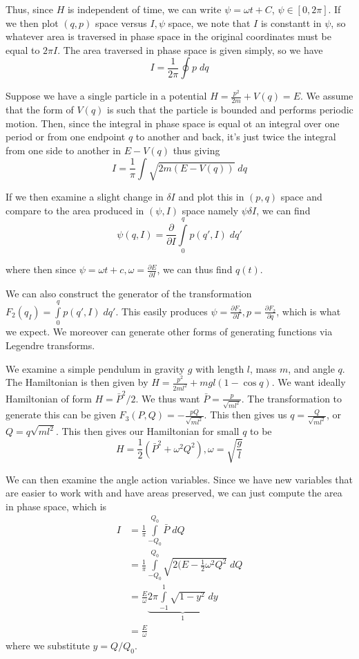 \documentclass[10pt]{report}
\newcommand{\pd}[2]{\frac{\partial #1}{\partial#2}}
\begin{document}
Thus, since $H$ is independent of time, we can write $\psi = \omega t + C$, $\psi \in \left[ 0,2\pi \right]$. If we then plot $(q,p)$ space versus $I,\psi$ space, we note that $I$ is constantt in $\psi$, so whatever area is traversed in phase space in the original coordinates must be equal to $2\pi I$. The area traversed in phase space is given simply, so we have
$$I = \frac{1}{2\pi}\oint p\; dq$$

Suppose we have a single particle in a potential $H = \frac{p^2}{2m} + V(q) = E$. We assume that the form of $V(q)$ is such that the particle is bounded and performs periodic motion. Then, since the integral in phase space is equal ot an integral over one period or from one endpoint $q$ to another and back, it's just twice the integral from one side to another in $E - V(q)$ thus giving
$$I = \frac{1}{\pi}\int \sqrt{2m(E-V(q))}\; dq$$

If we then examine a slight change in $\delta I$ and plot this in $(p,q)$ space and compare to the area produced in $(\psi,I)$ space namely $\psi \delta I$, we can find
$$\psi(q,I) = \pd{}{I}\displaystyle\int\limits_{0}^{q}p(q',I)\;dq'$$

where then since $\psi = \omega t + c, \omega = \pd{E}{I}$, we can thus find $q(t)$.

We can also construct the generator of the transformation $F_2(q_I) = \displaystyle\int\limits_{0}^{q}p(q',I)\;dq'$. This easily produces $\psi = \pd{F_2}{I}, p = \pd{F_2}{q}$, which is what we expect. We moreover can generate other forms of generating functions via Legendre transforms.

We examine a simple pendulum in gravity $g$ with length $l$, mass $m$, and angle $q$. The Hamiltonian is then given by $H = \frac{p^2}{2ml^2} + mgl(1-\cos q)$. We want ideally Hamiltonian of form $H = \bar{P}^2/2$. We thus want $\bar{P} = \frac{p}{\sqrt{ml^2}}$. The transformation to generate this can be given $F_3(P,Q) = -\frac{pQ}{\sqrt{ml^2}}$. This then gives us $q = \frac{Q}{\sqrt{ml^2}}$, or $Q = q\sqrt{ml^2}$. This then gives our Hamiltonian for small $q$ to be 
$$H = \frac{1}{2}(\bar{P}^2 + \omega^2Q^2), \omega = \sqrt{\frac{g}{l}}$$

We can then examine the angle action variables. Since we have new variables that are easier to work with and have areas preserved, we can just compute the area in phase space, which is
\begin{align*}
    I &= \frac{1}{\pi}\displaystyle\int\limits_{-Q_0}^{Q_0}\bar{P}\;dQ\\
    &= \frac{1}{\pi}\displaystyle\int\limits_{-Q_0}^{Q_0}\sqrt{2(E-\frac{1}{2}\omega^2Q^2}\;dQ\\
    &= \frac{E}{\omega}\underbrace{2\pi \displaystyle\int\limits_{-1}^{1}\sqrt{1-y^2}\;dy}_{1}\\
    &= \frac{E}{\omega}
\end{align*}
where we substitute $y = Q/Q_0$.
\end{document}
